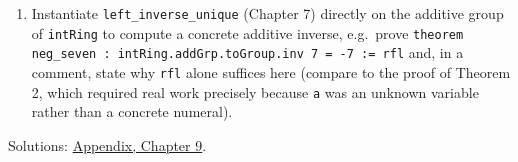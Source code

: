 \begin{enumerate}
  Prove \texttt{theorem neg\_\allowbreak{}mul (a b : R) : Rg.mul (Rg.addGrp.toGroup.inv a) b = Rg.addGrp.toGroup.inv (Rg.mul a b)}. Strategy: this is ``show \(x = -(ab)\),'' hence reduce through \texttt{left\_\allowbreak{}inverse\_\allowbreak{}unique} to ``show \(x + ab = 0\),'' then look for a \texttt{right\_\allowbreak{}distrib}-shaped simplification of \((-a)\cdot b + a \cdot b\), exactly as in Theorem 2. \texttt{mul\_\allowbreak{}zero\_\allowbreak{}left} (proved in the section for Theorem 2) is required at the end, the same way Theorem 2 itself used it.
\item
  Instantiate \texttt{left\_\allowbreak{}inverse\_\allowbreak{}unique} (Chapter 7) directly on the additive group of \texttt{intRing} to compute a concrete additive inverse, e.g.~prove \texttt{theorem neg\_\allowbreak{}seven : intRing.addGrp.toGroup.inv 7 = -\allowbreak{}7 := rfl} and, in a comment, state why \texttt{rfl} alone suffices here (compare to the proof of Theorem 2, which required real work precisely because \texttt{a} was an unknown variable rather than a concrete numeral).
\end{enumerate}

Solutions: \hyperref[sec:14-appendix-solutions:08-chapter-9:1]{Appendix, Chapter 9}.

